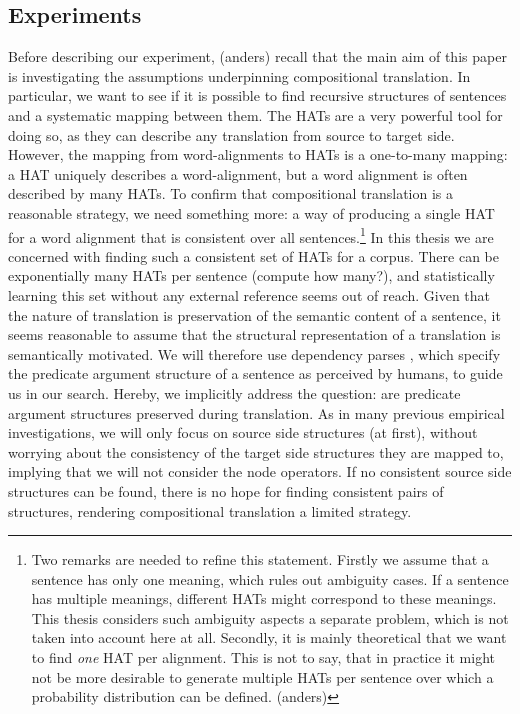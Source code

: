 \documentclass{report}
\theoremstyle{definition}
\theoremstyle{plain}
\begin{document}
\subsection{Experiments}

Before describing our experiment, (anders) recall that the main aim of this paper is investigating the assumptions underpinning compositional translation. In particular, we want to see if it is possible to find recursive structures of sentences and a systematic mapping between them. The HATs are a very powerful tool for doing so, as they can describe any translation from source to target side. However, the mapping from word-alignments to HATs is a one-to-many mapping: a HAT uniquely describes a word-alignment, but a word alignment is often described by many HATs. To confirm that compositional translation is a reasonable strategy, we need something more: a way of producing a single HAT for a word alignment that is consistent over all sentences.\footnote{Two remarks are needed to refine this statement. Firstly we assume that a sentence has only one meaning, which rules out ambiguity cases. If a sentence has multiple meanings, different HATs might correspond to these meanings. This thesis considers such ambiguity aspects a separate problem, which is not taken into account here at all. Secondly, it is mainly theoretical that we want to find \textit{one} HAT per alignment. This is not to say, that in practice it might not be more desirable to generate multiple HATs per sentence over which a probability distribution can be defined. (anders)} In this thesis we are concerned with finding such a consistent set of HATs for a corpus. There can be exponentially many HATs per sentence (compute how many?), and statistically learning this set without any external reference seems out of reach. Given that the nature of translation is preservation of the semantic content of a sentence, it seems reasonable to assume that the structural representation of a translation is semantically motivated. We will therefore use dependency parses \citep{schubert1987metataxis}, which specify the predicate argument structure of a sentence as perceived by humans, to guide us in our search. Hereby, we implicitly address the question: are predicate argument structures preserved during translation. As in many previous empirical investigations, we will only focus on source side structures (at first), without worrying about the consistency of the target side structures they are mapped to, implying that we will not consider the node operators. If no consistent source side structures can be found, there is no hope for finding consistent pairs of structures, rendering compositional translation a limited strategy.
\end{document}
